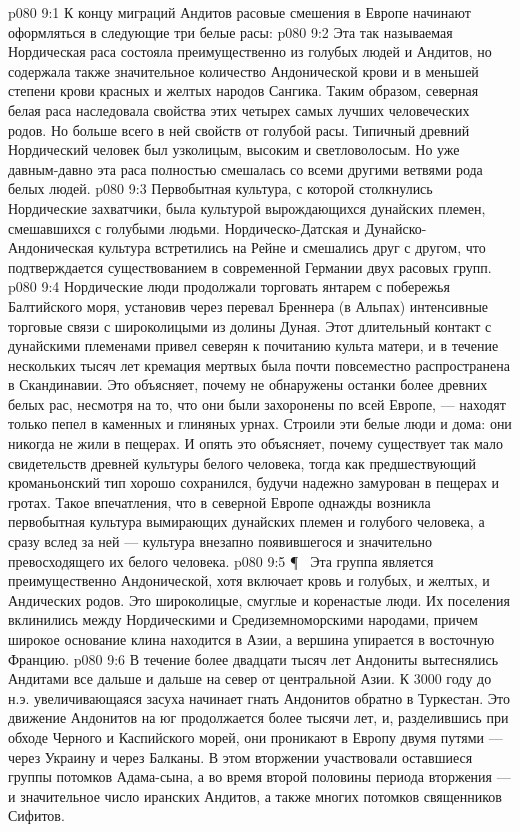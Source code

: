 \vs p080 9:1 К концу миграций Андитов расовые смешения в Европе начинают оформляться в следующие три белые расы:
\vs p080 9:2 \bibnobreakspace {} Эта так называемая Нордическая раса состояла преимущественно из голубых людей и Андитов, но содержала также значительное количество Андонической крови и в меньшей степени крови красных и желтых народов Сангика. Таким образом, северная белая раса наследовала свойства этих четырех самых лучших человеческих родов. Но больше всего в ней свойств от голубой расы. Типичный древний Нордический человек был узколицым, высоким и светловолосым. Но уже давным\hyp{}давно эта раса полностью смешалась со всеми другими ветвями рода белых людей.
\vs p080 9:3 Первобытная культура, с которой столкнулись Нордические захватчики, была культурой вырождающихся дунайских племен, смешавшихся с голубыми людьми. Нордическо\hyp{}Датская и Дунайско\hyp{}Андоническая культура встретились на Рейне и смешались друг с другом, что подтверждается существованием в современной Германии двух расовых групп.
\vs p080 9:4 Нордические люди продолжали торговать янтарем с побережья Балтийского моря, установив через перевал Бреннера (в Альпах) интенсивные торговые связи с широколицыми из долины Дуная. Этот длительный контакт с дунайскими племенами привел северян к почитанию культа матери, и в течение нескольких тысяч лет кремация мертвых была почти повсеместно распространена в Скандинавии. Это объясняет, почему не обнаружены останки более древних белых рас, несмотря на то, что они были захоронены по всей Европе, --- находят только пепел в каменных и глиняных урнах. Строили эти белые люди и дома: они никогда не жили в пещерах. И опять это объясняет, почему существует так мало свидетельств древней культуры белого человека, тогда как предшествующий кроманьонский тип хорошо сохранился, будучи надежно замурован в пещерах и гротах. Такое впечатления, что в северной Европе однажды возникла первобытная культура вымирающих дунайских племен и голубого человека, а сразу вслед за ней --- культура внезапно появившегося и значительно превосходящего их белого человека.
\vs p080 9:5 \P\ \bibnobreakspace {} Эта группа является преимущественно Андонической, хотя включает кровь и голубых, и желтых, и Андических родов. Это широколицые, смуглые и коренастые люди. Их поселения вклинились между Нордическими и Средиземноморскими народами, причем широкое основание клина находится в Азии, а вершина упирается в восточную Францию.
\vs p080 9:6 В течение более двадцати тысяч лет Андониты вытеснялись Андитами все дальше и дальше на север от центральной Азии. К 3000 году до н.э. увеличивающаяся засуха начинает гнать Андонитов обратно в Туркестан. Это движение Андонитов на юг продолжается более тысячи лет, и, разделившись при обходе Черного и Каспийского морей, они проникают в Европу двумя путями --- через Украину и через Балканы. В этом вторжении участвовали оставшиеся группы потомков Адама\hyp{}сына, а во время второй половины периода вторжения --- и значительное число иранских Андитов, а также многих потомков священников Сифитов.
